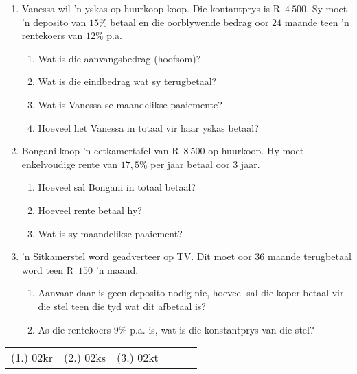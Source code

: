 \begin{exercises}{}
{
    \begin{enumerate}[label=\textbf{\arabic*}.]
	\item Vanessa wil 'n yskas op huurkoop koop. Die kontantprys is R~$4~500$. Sy moet 'n deposito van $15\%$ betaal en die oorblywende bedrag oor $24$ maande teen 'n rentekoers van $12\%$ p.a.
	\begin{enumerate}
	    \item Wat is die aanvangsbedrag (hoofsom)?
	    \item Wat is die eindbedrag wat sy terugbetaal?
	    \item Wat is Vanessa se maandelikse paaiemente?
	    \item Hoeveel het Vanessa in totaal vir haar yskas betaal?
	\end{enumerate}
	\item Bongani koop ’n eetkamertafel van R~$8~500$ op huurkoop. Hy moet enkelvoudige rente van $17,5\%$ per jaar betaal oor 3 jaar.
	\begin{enumerate}
	    \item Hoeveel sal Bongani in totaal betaal?
	    \item Hoeveel rente betaal hy?
	    \item Wat is sy maandelikse paaiement?
	\end{enumerate}
	\item 'n Sitkamerstel word geadverteer op TV. Dit moet oor $36$ maande terugbetaal word teen R~$150$ 'n maand.
	\begin{enumerate}
	    \item Aanvaar daar is geen deposito nodig nie, hoeveel sal die koper betaal vir die stel teen die tyd wat dit afbetaal is?
	    \item As die rentekoers $9\%$ p.a. is, wat is die konstantprys van die stel?\\
	\end{enumerate}
    \end{enumerate}

\par \practiceinfo
\par \begin{tabular}[h]{cccccc}
(1.)	02kr	&
(2.)	02ks	&
(3.)	02kt	&
\end{tabular}
}
\end{exercises}




